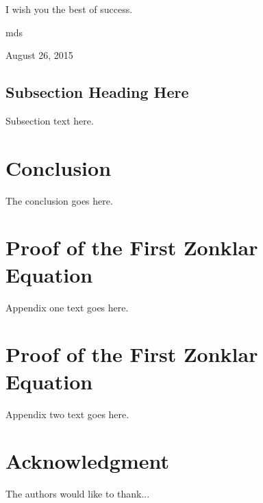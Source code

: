 \documentclass[journal]{IEEEtran}
\begin{document}
I wish you the best of success.

\hfill mds
 
\hfill August 26, 2015

\subsection{Subsection Heading Here}
Subsection text here.



\section{Conclusion}
The conclusion goes here.



\appendices
\section{Proof of the First Zonklar Equation}
Appendix one text goes here.

\section{Proof of the First Zonklar Equation}
Appendix two text goes here.


\section*{Acknowledgment}

The authors would like to thank...


\ifCLASSOPTIONcaptionsoff
  \newpage
\fi

\end{document}
